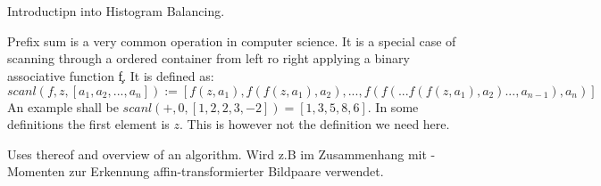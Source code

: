 \section{\algo}
  Introductipn into Histogram Balancing.
  
  Prefix sum is a very common operation in computer science. It is a special
    case of scanning through a ordered container from left ro right applying a binary
    associative function \c{f}.
    It is defined as:
      $$ scanl(f,z,[a_1,a_2,...,a_n])
         := [f(z,a_1),f(f(z,a_1),a_2),...,f(f(...f(f(z,a_1),a_2)...,a_{n-1}),a_n)]
      $$
    An example shall be $scanl(+,0,[1,2,2,3,-2]) = [1,3,5,8,6]$. In some definitions
    the first element is $z$. This is however not the definition we need here.
    
  
  Uses thereof and overview of an algorithm.
  Wird z.B im Zusammenhang mit \mu-Momenten zur Erkennung
    affin-transformierter Bildpaare verwendet.
